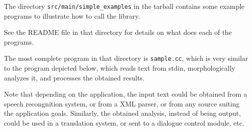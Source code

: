 \documentclass[a4paper]{book}
\begin{document}
 The directory {\tt src/main/simple\_examples} in the tarball contains 
 some example programs to illustrate how to call the library.

 See the README file in that directory for details on what does each of the 
 programs.

 The most complete program in that directory is {\tt sample.cc}, which
 is very similar to the program depicted below, which
 reads text from stdin, morphologically analyzes it, and processes 
 the obtained results. 

  Note that depending on the application, the input text
  could be obtained from a speech recongnition system, or from a 
  XML parser, or from any source suiting the application goals. 
  Similarly, the obtained analysis, instead of being output, could
  be used in a translation system, or sent to a dialogue control module, etc.
\end{document}
